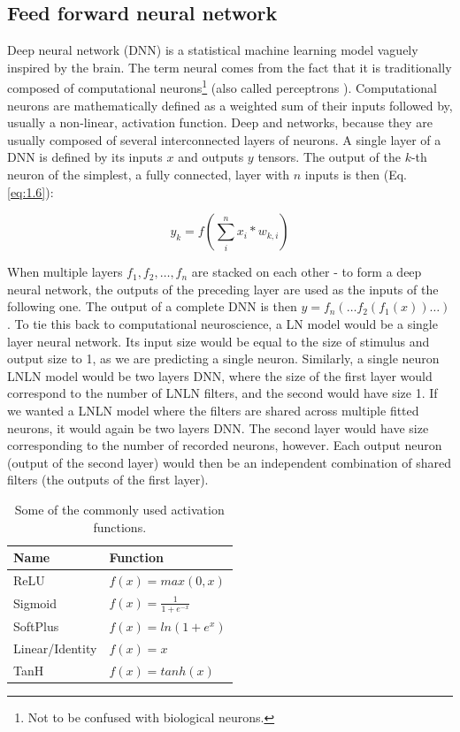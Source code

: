 \subsection{Feed forward neural network}
Deep neural network (DNN) is a statistical machine learning model vaguely inspired by the brain. The term neural comes from the fact that it is traditionally composed of computational neurons\footnote{Not to be confused with biological neurons.} (also called perceptrons \cite{Rosenblatt1958ThePA}). Computational neurons are mathematically defined as a weighted sum of their inputs followed by, usually a non-linear, activation function. Deep and networks, because they are usually composed of several interconnected layers of neurons. A single layer of a DNN is defined by its inputs $x$ and outputs $y$ tensors. The output of the $k$-th neuron of the simplest, a fully connected, layer with $n$ inputs is then (Eq. \ref{eq:1.6}):

\begin{equation}\label{eq:1.6}
    y_k = f(\sum_{i}^{n} x_{i} * w_{k,i})
\end{equation}

When multiple layers $f_1, f_2, \dots, f_n$ are stacked on each other - to form a deep neural network, the outputs of the preceding layer are used as the inputs of the following one. The output of a complete DNN is then $y = f_n(\dots f_2(f_1(x))\dots)$. To tie this back to computational neuroscience, a LN model would be a single layer neural network. Its input size would be equal to the size of stimulus and output size to 1, as we are predicting a single neuron. Similarly, a single neuron LNLN model would be two layers DNN, where the size of the first layer would correspond to the number of LNLN filters, and the second would have size 1. If we wanted a LNLN model where the filters are shared across multiple fitted neurons, it would again be two layers DNN. The second layer would have size corresponding to the number of recorded neurons, however. Each output neuron (output of the second layer) would then be an independent combination of shared filters (the outputs of the first layer).

\begin{table}[h]
    \renewcommand{\arraystretch}{1.2}
    \centering
    \begin{tabular}{|l|l|}
        \hline
        \textbf{Name} & \textbf{Function} \\ \hline
        ReLU & $f(x) = max(0, x)$ \\ \hline
        Sigmoid & $f(x) = \frac{1 }{1 + e^{-x} } $ \\ \hline
        SoftPlus & $f(x) = ln(1+e^x)$ \\ \hline
        Linear/Identity & $f(x) = x$ \\ \hline
        TanH & $f(x) = tanh(x)$ \\ \hline

    \end{tabular}
    \caption[Commonly used activation functions]{Some of the commonly used activation functions\protect\footnotemark.}
    \label{tab:1.1}
    \renewcommand{\arraystretch}{1.0}
\end{table}

